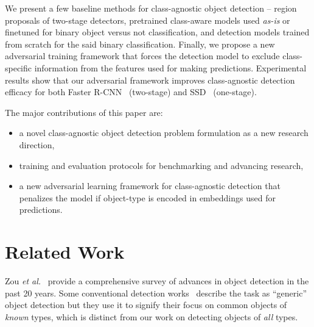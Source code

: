 \documentclass[10pt,twocolumn,letterpaper]{article}
\begin{document}
We present a few baseline methods for class-agnostic object detection -- region proposals of two-stage detectors, pretrained class-aware models used \textit{as-is} or finetuned for binary object versus not classification, and detection models trained from scratch for the said binary classification. Finally, we propose a new adversarial training framework that forces the detection model to exclude class-specific information from the features used for making predictions. Experimental results show that our adversarial framework improves class-agnostic detection efficacy for both Faster R-CNN~\cite{bib:frcnn} (two-stage) and SSD~\cite{bib:ssd} (one-stage).

The major contributions of this paper are:
\vspace{-5pt}
\begin{itemize}
    \setlength\itemsep{-0.5em}
    \item a novel class-agnostic object detection problem formulation as a new research direction,
    \item training and evaluation protocols for benchmarking and advancing research,
    \item a new adversarial learning framework for class-agnostic detection that penalizes the model if object-type is encoded in embeddings used for predictions.
\end{itemize}
 \section{Related Work}
\label{sec:related_work}

Zou \textit{et al.}~\cite{bib:obj_survey} provide a comprehensive survey of advances in object detection in the past 20 years. Some conventional detection works~\cite{bib:gen_obj_1,bib:gen_obj_2,bib:gen_obj_3,bib:gen_obj_4,bib:gen_obj_5} describe the task as ``generic'' object detection but they use it to signify their focus on common objects of \emph{known} types, which is distinct from our work on detecting objects of \emph{all} types.
\end{document}
